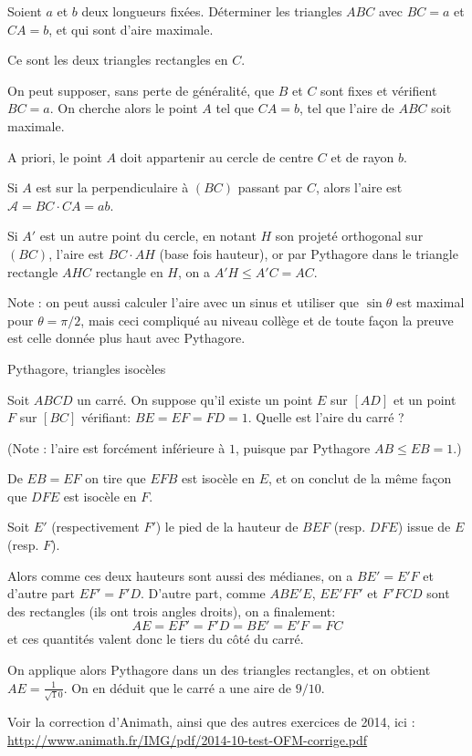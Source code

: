 \begin{exo}[Aire maximale à deux côtés fixés]
Soient $a$ et $b$ deux longueurs fixées. Déterminer les triangles $ABC$ avec $BC=a$ et $CA=b$, et qui sont d'aire maximale.
\begin{hint}
Ce sont les deux triangles rectangles en $C$.
\end{hint}
\begin{sol}
On peut supposer, sans perte de généralité, que $B$ et $C$ sont fixes et vérifient $BC=a$. On cherche alors le point $A$ tel que $CA=b$, tel que l'aire de $ABC$ soit maximale. 

A priori, le point $A$ doit appartenir au cercle de centre $C$ et de rayon $b$.

Si $A$ est sur la perpendiculaire à $(BC)$ passant par $C$, alors l'aire est $\mathcal A = BC\cdot CA = ab$.

Si $A'$ est un autre point du cercle, en notant $H$ son projeté orthogonal sur $(BC)$, l'aire est $BC\cdot AH$ (base fois hauteur), or par Pythagore dans le triangle rectangle $AHC$ rectangle en $H$, on a $A'H \leq A'C=AC$.

Note : on peut aussi calculer l'aire avec un sinus et utiliser que $\sin\theta$ est maximal pour $\theta=\pi/2$, mais ceci compliqué au niveau collège et de toute façon la preuve est celle donnée plus haut avec Pythagore.
\end{sol}
\end{exo}


\begin{exo}
\begin{prerequis}
Pythagore, triangles isocèles
\end{prerequis}
Soit $ABCD$ un carré. On suppose qu'il existe un point $E$ sur $[AD]$ et un point $F$ sur $[BC]$ vérifiant: $BE=EF=FD=1$. Quelle est l'aire du carré ?
\begin{sol}
(Note : l'aire est forcément inférieure à $1$, puisque par Pythagore $AB\leq EB=1$.)

De $EB=EF$ on tire que $EFB$ est isocèle en $E$, et on conclut de la même façon que $DFE$ est isocèle en $F$.

Soit $E'$ (respectivement $F'$) le pied de la hauteur de $BEF$ (resp. $DFE$) issue de $E$ (resp. $F$).

Alors comme ces deux hauteurs sont aussi des médianes, on a $BE'=E'F$ et d'autre part $EF'=F'D$.
D'autre part, comme $ABE'E$, $EE'FF'$ et $F'FCD$ sont des rectangles (ils ont trois angles droits), on a finalement:
\[ AE=EF'=F'D  =  BE'=E'F=FC \]
et ces quantités  valent donc le tiers du côté du carré.

On applique alors Pythagore dans un des triangles rectangles, et on obtient $AE=\frac{1}{\sqrt 10}$. On en déduit que le carré a une aire de $9/10$.

Voir la correction d'Animath, ainsi que des autres exercices de 2014, ici : \url{http://www.animath.fr/IMG/pdf/2014-10-test-OFM-corrige.pdf}


\end{sol}
\end{exo}

